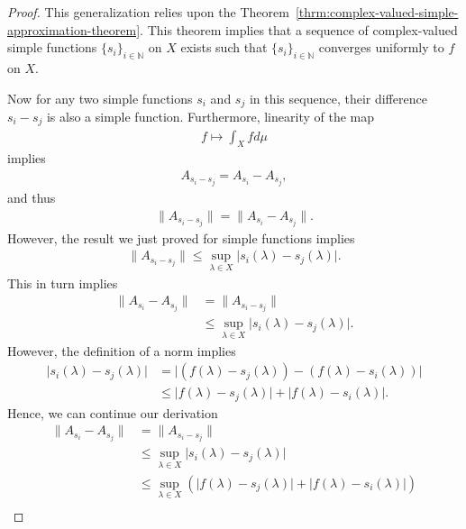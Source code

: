 \begin{proof}
    \leanok
This generalization relies upon the Theorem~\ref{thrm:complex-valued-simple-approximation-theorem}. This theorem implies that a sequence of complex-valued simple functions $\{s_i\}_{i \in \mathbb{N}}$ on $X$ exists such that $\{s_i\}_{i \in \mathbb{N}}$ converges uniformly to $f$ on $X$.

Now for any two simple functions $s_i$ and $s_j$ in this sequence, their difference $s_i - s_j$ is also a simple function. Furthermore, linearity of the map
\begin{align}
    f \longmapsto \int_X f d\mu
\end{align}
implies
\begin{align}
    A_{s_i - s_j} = A_{s_i} - A_{s_j},
\end{align}
and thus
\begin{align}
    \|A_{s_i - s_j}\| = \|A_{s_i} - A_{s_j}\|.
\end{align}
However, the result we just proved for simple functions implies
\begin{align}
    \|A_{s_i - s_j}\| \le \sup_{\lambda \in X} \lvert s_i(\lambda) - s_j(\lambda) \rvert.
\end{align}
This in turn implies
\begin{align}
    \|A_{s_i} - A_{s_j}\| &= \|A_{s_i - s_j}\| \\
                          &\le \sup_{\lambda \in X} \lvert s_i(\lambda) - s_j(\lambda) \rvert.
\end{align}
However, the definition of a norm implies
\begin{align}
    \lvert s_i(\lambda) - s_j(\lambda) \rvert &=   \lvert (f(\lambda) - s_j(\lambda)) - (f(\lambda) - s_i(\lambda)) \rvert \\
                                    &\le \lvert f(\lambda) - s_j(\lambda) \rvert + \lvert f(\lambda) - s_i(\lambda) \rvert.
\end{align}
Hence, we can continue our derivation
\begin{align}
    \|A_{s_i} - A_{s_j}\| &= \|A_{s_i - s_j}\| \\
                          &\le \sup_{\lambda \in X} \lvert s_i(\lambda) - s_j(\lambda) \rvert \\
                          &\le \sup_{\lambda \in X} \left( \lvert f(\lambda) - s_j(\lambda) \rvert + \lvert f(\lambda) - s_i(\lambda) \rvert \right) \\

\end{align}
\end{proof}
